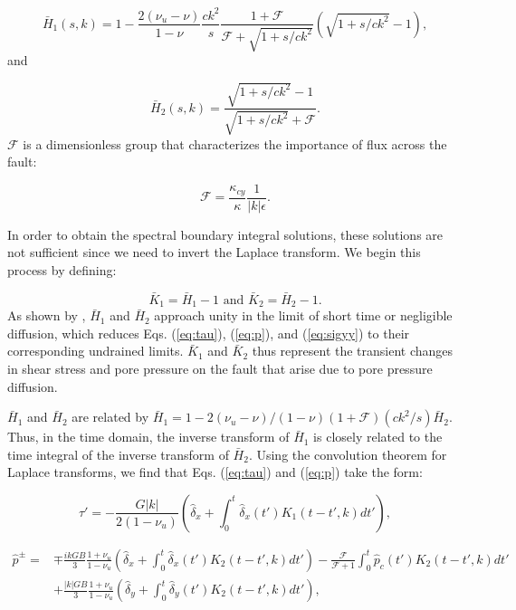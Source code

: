 \documentclass[draft]{agujournal2019}
\begin{document}
\begin{equation}
\bar{H}_1(s,k) = 1 - \frac{2(\nu_u - \nu)}{1-\nu} \frac{c k^2}{s} \frac{1 + \mathcal{F}}{\mathcal{F} + \sqrt{1+s/c k^2}}\left( \sqrt{1+s/c k^2} - 1 \right),
\label{eq:H1}
\end{equation}
and

\begin{equation}
\bar{H}_2(s,k) = \frac{\sqrt{1+s/c k^2} - 1}{\sqrt{1+s/c k^2} + \mathcal{F}} .
\label{eq:H2}
\end{equation}
$\mathcal{F}$ is a dimensionless group that characterizes the importance of flux across the fault:

\begin{equation}
\mathcal{F} = \frac{\kappa_{cy}}{\kappa} \frac{1}{|k|\epsilon} .
\label{eq:F}
\end{equation}

In order to obtain the spectral boundary integral solutions, these solutions are not sufficient since we need to invert the Laplace transform. We begin this process by defining:

\begin{equation}
    \bar{K}_1 = \bar{H}_1 - 1 \text{ and } \bar{K}_2 = \bar{H}_2 - 1.
\end{equation}
As shown by , $\bar{H}_1$ and $\bar{H}_2$ approach unity in the limit of short time or negligible diffusion, which reduces Eqs. (\ref{eq:tau}), (\ref{eq:p}), and (\ref{eq:sigyy}) to their corresponding undrained limits. $\bar{K}_1$ and $\bar{K}_2$ thus represent the transient changes in shear stress and pore pressure on the fault that arise due to pore pressure diffusion.

$\bar{H}_1$ and $\bar{H}_2$ are related by $\bar{H}_1 = 1 - 2 (\nu_u - \nu)/(1 - \nu) (1 + \mathcal{F}) (c k^2/s) \bar{H}_2$. Thus, in the time domain, the inverse transform of $\bar{H}_1$ is closely related to the time integral of the inverse transform of $\bar{H}_2$. Using the convolution theorem for Laplace transforms, we find that Eqs. (\ref{eq:tau}) and (\ref{eq:p}) take the form:

\begin{equation}
\hat{\tau}' = -  \frac{G |k|}{2(1-\nu_u)} \left( \hat{\delta}_x + \int_0^t \hat{\delta}_x(t') K_1 (t - t',k) dt' \right),
\label{eq:tauIL}
\end{equation}	


\begin{align}
\hat{p}^\pm = & \mp \frac{ik  G B }{3} \frac{1+\nu_u}{1-\nu_u} \left( \hat{\delta}_x + \int_0^t \hat{\delta}_x(t') K_2 (t - t',k) dt' \right) - \frac{\mathcal{F}}{\mathcal{F} + 1} \int_0^t \hat{p}_c(t') K_2 (t - t',k) dt' \label{eq:pIL} \\ \nonumber
& + \frac{|k| G B }{3} \frac{1+\nu_u}{1-\nu_u} \left( \hat{\delta}_y + \int_0^t \hat{\delta}_y(t') K_2 (t - t',k) dt' \right),
\end{align}	
\end{document}
